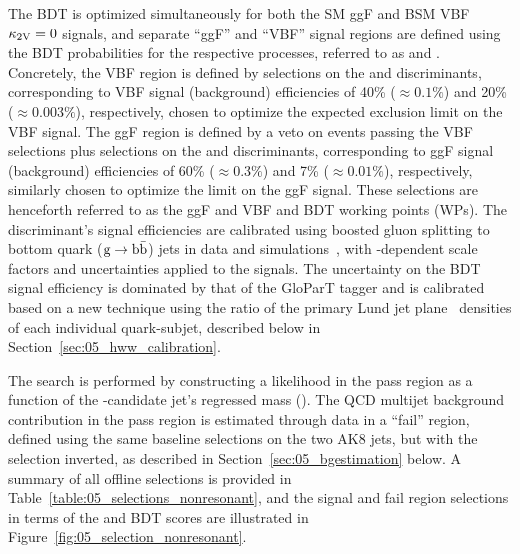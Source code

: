 The BDT is optimized simultaneously for both the SM ggF and BSM VBF $\kappa_{2\textrm{V}}=0$ signals, and separate ``ggF'' and ``VBF'' signal regions are defined using the BDT probabilities for the respective processes, referred to as \ggfbdt and \vbfbdt.
Concretely, the VBF region is defined by selections on the \TXbb and \vbfbdt discriminants, corresponding to VBF signal (background) efficiencies of 40\% ($\approx 0.1\%$) and 20\% ($\approx 0.003\%$), respectively, chosen to optimize the expected exclusion limit on the VBF signal.
The ggF region is defined by a veto on events passing the VBF selections plus selections on the \TXbb and \ggfbdt discriminants, corresponding to ggF signal (background) efficiencies of 60\% ($\approx 0.3\%$) and 7\% ($\approx 0.01\%$), respectively, similarly chosen to optimize the limit on the ggF signal.
These selections are henceforth referred to as the ggF and VBF \TXbb and BDT working points (WPs).
The \TXbb discriminant's signal efficiencies are calibrated using boosted gluon splitting to bottom quark ($\textrm{g}\to\textrm{b}\bar{\textrm{b}}$) jets in data and simulations~\cite{CMS:2023tlv}, with \pt-dependent scale factors and uncertainties applied to the \HH signals.
The uncertainty on the BDT signal efficiency is dominated by that of the GloParT tagger and is calibrated based on a new technique using the ratio of the primary Lund jet plane~\cite{Dreyer:2018nbf} densities of each individual quark-subjet, described below in Section~\ref{sec:05_hww_calibration}.

The search is performed by constructing a likelihood in the pass region as a function of the \hbb-candidate jet's regressed mass (\mregbb).
The QCD multijet background contribution in the pass region is estimated through data in a ``fail'' region, defined using the same baseline selections on the two AK8 jets, but with the \TXbb selection inverted, as described in Section~\ref{sec:05_bgestimation} below.
A summary of all offline selections is provided in Table~\ref{table:05_selections_nonresonant}, and the signal and fail region selections in terms of the \TXbbbb and BDT scores are illustrated in Figure~\ref{fig:05_selection_nonresonant}.

